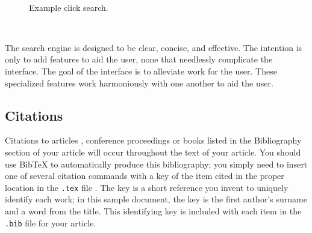 \documentclass{sig-alternate-05-2015}
\begin{document}
 ~
\begin{figure}[h]
\center
{}
\caption{Example click search.}
\center
\end{figure}
~

 The search engine is designed to be clear, concise, and effective. The intention is only to add features to aid the user, none that needlessly complicate the interface. The goal of the interface is to alleviate work for the user. These specialized features work harmoniously with one another to aid the user.  


\iffalse
\subsection{Citations}
Citations to articles \cite{bowman:reasoning,
clark:pct, braams:babel, herlihy:methodology},
conference proceedings \cite{clark:pct} or
books \cite{salas:calculus, Lamport:LaTeX} listed
in the Bibliography section of your
article will occur throughout the text of your article.
You should use BibTeX to automatically produce this bibliography;
you simply need to insert one of several citation commands with
a key of the item cited in the proper location in
the \texttt{.tex} file \cite{Lamport:LaTeX}.
The key is a short reference you invent to uniquely
identify each work; in this sample document, the key is
the first author's surname and a
word from the title.  This identifying key is included
with each item in the \texttt{.bib} file for your article.
\end{document}
